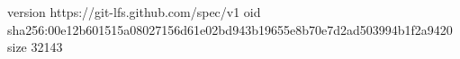 version https://git-lfs.github.com/spec/v1
oid sha256:00e12b601515a08027156d61e02bd943b19655e8b70e7d2ad503994b1f2a9420
size 32143
